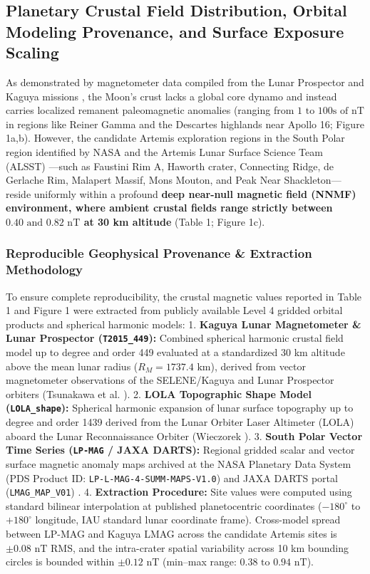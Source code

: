 \documentclass[default,sn-nature,iicol]{sn-jnl}
\begin{document}
\subsection{Planetary Crustal Field Distribution, Orbital Modeling Provenance, and Surface Exposure Scaling}
As demonstrated by magnetometer data compiled from the Lunar Prospector and Kaguya missions \cite{ref16,ref17,ref18}, the Moon's crust lacks a global core dynamo and instead carries localized remanent paleomagnetic anomalies (ranging from $1\text{ to }100\text{s of nT}$ in regions like Reiner Gamma and the Descartes highlands near Apollo 16; Figure 1a,b). However, the candidate Artemis exploration regions in the South Polar region identified by NASA and the Artemis Lunar Surface Science Team (ALSST) \cite{ref1,ref6,ref16}---such as Faustini Rim A, Haworth crater, Connecting Ridge, de Gerlache Rim, Malapert Massif, Mons Mouton, and Peak Near Shackleton---reside uniformly within a profound \textbf{deep near-null magnetic field (NNMF) environment, where ambient crustal fields range strictly between $0.40\text{ and }0.82\text{ nT}$ at 30 km altitude} (Table 1; Figure 1c). 






\subsubsection{Reproducible Geophysical Provenance \& Extraction Methodology}
To ensure complete reproducibility, the crustal magnetic values reported in Table 1 and Figure 1 were extracted from publicly available Level 4 gridded orbital products and spherical harmonic models:
1. \textbf{Kaguya Lunar Magnetometer \& Lunar Prospector (\texttt{T2015\_449}):} Combined spherical harmonic crustal field model up to degree and order 449 evaluated at a standardized 30 km altitude above the mean lunar radius ($R_M = 1737.4\text{ km}$), derived from vector magnetometer observations of the SELENE/Kaguya and Lunar Prospector orbiters (Tsunakawa et al. \cite{ref17}).
2. \textbf{LOLA Topographic Shape Model (\texttt{LOLA\_shape}):} Spherical harmonic expansion of lunar surface topography up to degree and order 1439 derived from the Lunar Orbiter Laser Altimeter (LOLA) aboard the Lunar Reconnaissance Orbiter (Wieczorek \cite{ref84}).
3. \textbf{South Polar Vector Time Series (\texttt{LP-MAG} / JAXA DARTS):} Regional gridded scalar and vector surface magnetic anomaly maps archived at the NASA Planetary Data System (PDS Product ID: \texttt{LP-L-MAG-4-SUMM-MAPS-V1.0}) and JAXA DARTS portal (\texttt{LMAG\_MAP\_V01}) \cite{ref16,ref18}.
4. \textbf{Extraction Procedure:} Site values were computed using standard bilinear interpolation at published planetocentric coordinates ($-180^\circ$ to $+180^\circ$ longitude, IAU standard lunar coordinate frame). Cross-model spread between LP-MAG and Kaguya LMAG across the candidate Artemis sites is $\pm 0.08\text{ nT}$ RMS, and the intra-crater spatial variability across 10 km bounding circles is bounded within $\pm 0.12\text{ nT}$ (min--max range: $0.38\text{ to }0.94\text{ nT}$).
\end{document}
